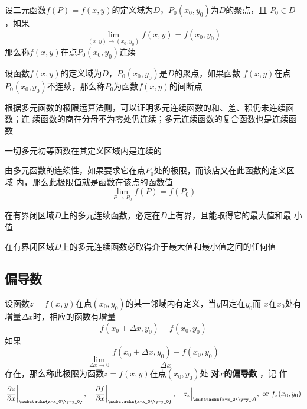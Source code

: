 \documentclass[11pt]{article}
\begin{document}
\begin{definition}[]
设二元函数\(f(P)=f(x,y)\)的定义域为\(D\)，\(P_0(x_0,y_0)\)为\(D\)的聚点，且
\(P_0\in D\)，如果
\begin{equation*}
\lim_{(x,y)\to(x_0,y_0)}f(x,y)=f(x_0,y_0)
\end{equation*}
那么称\(f(x,y)\)在点\(P_0(x_0,y_0)\)连续
\end{definition}

\begin{definition}[]
设函数\(f(x,y)\)的定义域为\(D\)，\(P_0(x_0,y_0)\)是\(D\)的聚点，如果函数
\(f(x,y)\)在点\(P_0(x_0,y_0)\)不连续，那么称\(P_0\)为函数\(f(x,y)\)的间断点
\end{definition}

根据多元函数的极限运算法则，可以证明多元连续函数的和、差、积仍未连续函数；连
续函数的商在分母不为零处仍连续；多元连续函数的复合函数也是连续函数

一切多元初等函数在其定义区域内是连续的

由多元函数的连续性，如果要求它在点\(P_0\)处的极限，而该店又在此函数的定义区域
内，那么此极限值就是函数在该点的函数值
\begin{equation*}
\lim_{P\to P_0}f(P)=f(P_0)
\end{equation*}

\begin{proposition}[有界性与最大值最小值定理]
在有界闭区域\(D\)上的多元连续函数，必定在\(D\)上有界，且能取得它的最大值和最
小值
\end{proposition}

\begin{proposition}[介值定理]
在有界闭区域\(D\)上的多元连续函数必取得介于最大值和最小值之间的任何值
\end{proposition}
\subsection{偏导数}
\label{sec:org0bd9440}
\begin{definition}[]
设函数\(z=f(x,y)\)在点\((x_0,y_0)\)的某一邻域内有定义，当\(y\)固定在\(y_0\)而
\(x\)在\(x_0\)处有增量\(\Delta x\)时，相应的函数有增量
\begin{equation*}
f(x_0+\Delta x,y_0)-f(x_0,y_0)
\end{equation*}
如果
\begin{equation*}
\lim_{\Delta x\to0}\frac{f(x_0+\Delta x,y_0)-f(x_0,y_0)}{\Delta x}
\end{equation*}
存在，那么称此极限为函数\(z=f(x,y)\)在点\((x_0,y_0)\)处 \textbf{对\(x\)的偏导数} ，记
作
\begin{equation*}
\left.\frac{\partial z}{\partial x}\right\rvert_{\substacks{x=x_0\\y=y_0}},\quad
\left.\frac{\partial f}{\partial x}\right\rvert_{\substacks{x=x_0\\y=y_0}},\quad
z_x\Big\rvert_{\substacks{x=x_0\\y=y_0}},\text{ or }
f_x(x_0,y_0)
\end{equation*}
\end{definition}
\end{document}
